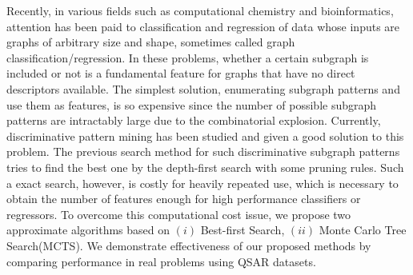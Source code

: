 Recently, in various fields such as computational chemistry and bioinformatics,
attention has been paid to classification and regression
of data whose inputs are graphs of arbitrary size and shape, 
sometimes called graph classification/regression.
In these problems,
whether a certain subgraph is included or not 
is a fundamental feature for graphs that have no direct descriptors available.
The simplest solution, 
enumerating subgraph patterns and use them as features, is so expensive 
since the number of possible subgraph patterns are intractably large 
due to the combinatorial explosion.
Currently, discriminative pattern mining has been studied and given a good solution to this problem.
The previous search method for such discriminative subgraph patterns 
tries to find the best one by the depth-first search with some pruning rules.
Such a exact search, however, is costly for heavily repeated use, 
which is necessary to obtain the number of features enough for high performance classifiers or regressors.
To overcome this computational cost issue, 
we propose two approximate algorithms based on 
$(i)$ Best-first Search, $(ii)$ Monte Carlo Tree Search(MCTS). 
We demonstrate effectiveness of our proposed methods by comparing performance 
in real problems using QSAR datasets.
